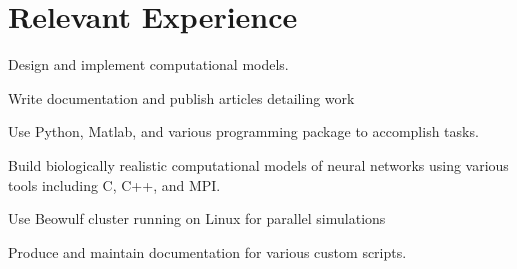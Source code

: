 \documentclass[]{deedy-resume-openfont}
\begin{document}
\begin{minipage}[t]{0.66\textwidth} 


\section{Relevant Experience}

\vspace{\topsep} %
\begin{tightemize}
\item Design and implement computational models.
\item Write documentation and publish articles detailing work
\item Use Python, Matlab, and various programming package to accomplish tasks.
\end{tightemize}
\sectionsep

\begin{tightemize}
\item Build biologically realistic computational models of neural networks using various tools including C, C++, and MPI.
\item Use Beowulf cluster running on Linux for parallel simulations
\item Produce and maintain documentation for various custom scripts.
\end{tightemize}
\sectionsep



\end{minipage}
\end{document}
